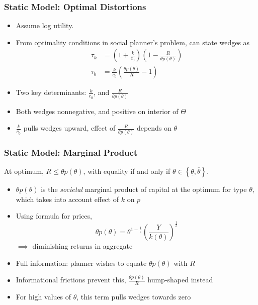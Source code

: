 \documentclass{beamer}
\begin{document}
\begin{frame}
    \frametitle{Static Model: Optimal Distortions}

    \begin{itemize}
        \item Assume log utility. 
        \item From optimality conditions in social planner's problem, can state wedges as 
        \begin{align*}
            \tau_{k}&=\left(1+\frac{k}{c_{0}}\right)\left(1-\frac{R}{\theta p\left(\theta\right)}\right) \\
        \tau_{b}&=\frac{k}{c_{0}}\left(\frac{\theta p\left(\theta\right)}{R} - 1\right) 
        \end{align*} 
        \item Two key determinants: \( \frac{k}{c_0} \), and \( \frac{R}{\theta p(\theta)} \) 
        \item Both wedges nonnegative, and positive on interior of \( \Theta \)
        \item \( \frac{k}{c_0} \) pulls wedges upward, effect of \( \frac{R}{\theta p(\theta)} \) depends on \( \theta \)
    \end{itemize}

\end{frame}

\begin{frame}
    \frametitle{Static Model: Marginal Product}

    \begin{lemma} \label{lem:thetap}
        At optimum, \( R\le\theta p(\theta) \), with equality if and only if \( \theta\in\left\{ \underline{\theta},\overline{\theta}\right\}  \).
    \end{lemma}

    \begin{itemize}
        \item \( \theta p(\theta) \) is the \textit{societal} marginal product of capital at the optimum for type \( \theta \), which takes into account effect of \( k \) on \( p \)
        \item Using formula for prices, 
        \begin{equation*}
            \theta p(\theta) = \theta^{1-\frac{1}{\varepsilon}} \left(\frac{Y}{ k\left(\theta\right)}\right)^{\frac{1}{\varepsilon}}
        \end{equation*} 
        \( \implies \) diminishing returns in aggregate
        \item Full information: planner wishes to equate \( \theta p(\theta) \) with \( R \)
        \item Informational frictions prevent this, \( \frac{\theta p(\theta)}{R} \) hump-shaped instead 
        \item For high values of \( \theta \), this term pulls wedges towards zero
    \end{itemize}

\end{frame}
\end{document}
